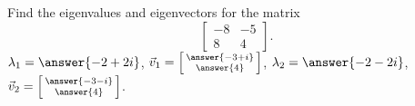 \documentclass{ximera}
\begin{document}
\begin{exercise}%
    Find the eigenvalues and eigenvectors for the matrix
    \[ 
        \begin{bmatrix} 
            -8 & -5 \\ 
            8 & 4
        \end{bmatrix}. 
    \]
    $\lambda_1 = \answer{-2 + 2i}$, $\vec{v}_1 = \left[\begin{smallmatrix} \answer{-3+i} \\ \answer{4}\end{smallmatrix}\right]$, $\lambda_2 = \answer{-2-2i}$, $\vec{v}_2 = \left[\begin{smallmatrix} \answer{-3-i} \\ \answer{4} \end{smallmatrix}\right]$. 
\end{exercise}
\end{document}
